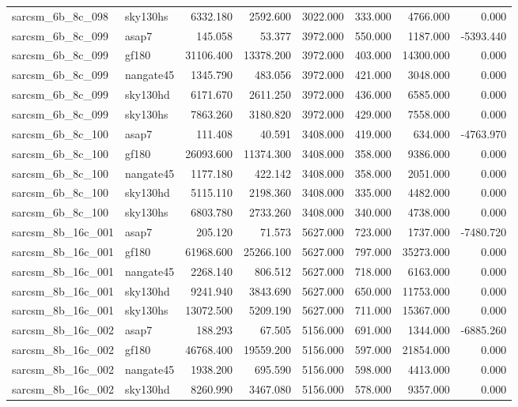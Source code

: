 \begin{tabular}{llrrrrrr}
sarcsm\_6b\_8c\_098 & sky130hs & 6332.180 & 2592.600 & 3022.000 & 333.000 & 4766.000 & 0.000 \\
sarcsm\_6b\_8c\_099 & asap7 & 145.058 & 53.377 & 3972.000 & 550.000 & 1187.000 & -5393.440 \\
sarcsm\_6b\_8c\_099 & gf180 & 31106.400 & 13378.200 & 3972.000 & 403.000 & 14300.000 & 0.000 \\
sarcsm\_6b\_8c\_099 & nangate45 & 1345.790 & 483.056 & 3972.000 & 421.000 & 3048.000 & 0.000 \\
sarcsm\_6b\_8c\_099 & sky130hd & 6171.670 & 2611.250 & 3972.000 & 436.000 & 6585.000 & 0.000 \\
sarcsm\_6b\_8c\_099 & sky130hs & 7863.260 & 3180.820 & 3972.000 & 429.000 & 7558.000 & 0.000 \\
sarcsm\_6b\_8c\_100 & asap7 & 111.408 & 40.591 & 3408.000 & 419.000 & 634.000 & -4763.970 \\
sarcsm\_6b\_8c\_100 & gf180 & 26093.600 & 11374.300 & 3408.000 & 358.000 & 9386.000 & 0.000 \\
sarcsm\_6b\_8c\_100 & nangate45 & 1177.180 & 422.142 & 3408.000 & 358.000 & 2051.000 & 0.000 \\
sarcsm\_6b\_8c\_100 & sky130hd & 5115.110 & 2198.360 & 3408.000 & 335.000 & 4482.000 & 0.000 \\
sarcsm\_6b\_8c\_100 & sky130hs & 6803.780 & 2733.260 & 3408.000 & 340.000 & 4738.000 & 0.000 \\
sarcsm\_8b\_16c\_001 & asap7 & 205.120 & 71.573 & 5627.000 & 723.000 & 1737.000 & -7480.720 \\
sarcsm\_8b\_16c\_001 & gf180 & 61968.600 & 25266.100 & 5627.000 & 797.000 & 35273.000 & 0.000 \\
sarcsm\_8b\_16c\_001 & nangate45 & 2268.140 & 806.512 & 5627.000 & 718.000 & 6163.000 & 0.000 \\
sarcsm\_8b\_16c\_001 & sky130hd & 9241.940 & 3843.690 & 5627.000 & 650.000 & 11753.000 & 0.000 \\
sarcsm\_8b\_16c\_001 & sky130hs & 13072.500 & 5209.190 & 5627.000 & 711.000 & 15367.000 & 0.000 \\
sarcsm\_8b\_16c\_002 & asap7 & 188.293 & 67.505 & 5156.000 & 691.000 & 1344.000 & -6885.260 \\
sarcsm\_8b\_16c\_002 & gf180 & 46768.400 & 19559.200 & 5156.000 & 597.000 & 21854.000 & 0.000 \\
sarcsm\_8b\_16c\_002 & nangate45 & 1938.200 & 695.590 & 5156.000 & 598.000 & 4413.000 & 0.000 \\
sarcsm\_8b\_16c\_002 & sky130hd & 8260.990 & 3467.080 & 5156.000 & 578.000 & 9357.000 & 0.000 \\

\end{tabular}
